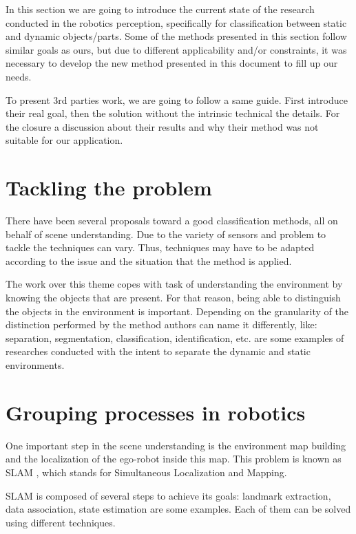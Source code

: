 
In this section we are going to introduce the current state of the research conducted in the robotics perception, specifically for classification between static and dynamic objects/parts. Some of the methods presented in this section follow similar goals as ours, but due to different applicability and/or constraints, it was necessary to develop the new method presented in this document to fill up our needs.

To present 3rd parties work, we are going to follow a same guide. First introduce their real goal, then the solution without the intrinsic technical the details. For the closure a discussion about their results and why their method was not suitable for our application.

\section{Tackling the problem}

There have been several proposals toward a good classification methods, all on behalf of scene understanding. Due to the variety of sensors and problem to tackle the techniques can vary. Thus, techniques may have to be adapted according to the issue and the situation that the method is applied.

The work over this theme copes with task of understanding the environment by knowing the objects that are present. For that reason, being able to distinguish the objects in the environment is important. Depending on the granularity of the distinction performed by the method authors can name it differently, like: separation, segmentation, classification, identification, etc. \cite{Wolf04onlinesimultaneous} \cite{DBLP:conf/iros/LidorisWB08} are some examples of researches conducted with the intent to separate the dynamic and static environments.

\section{Grouping processes in robotics}

One important step in the scene understanding is the environment map building and the localization of the ego-robot inside this map. This problem is known as SLAM \cite{Leonard2002Mobile} \cite{qadeerthesis}, which stands for Simultaneous Localization and  Mapping.

SLAM is composed of several steps to achieve its goals: landmark extraction, data association, state estimation are some examples. Each of them can be solved using different techniques.

